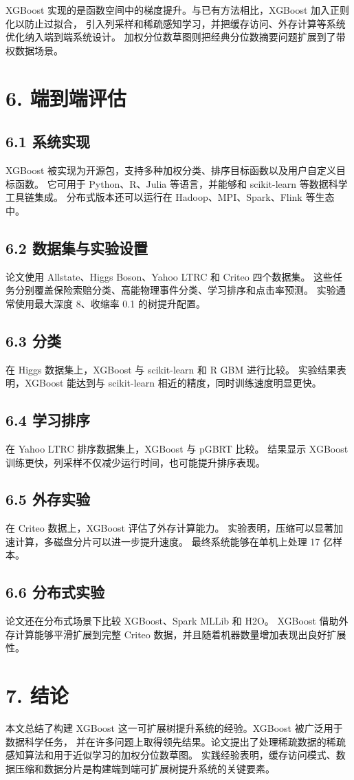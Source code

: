 XGBoost 实现的是函数空间中的梯度提升。与已有方法相比，XGBoost 加入正则化以防止过拟合，
引入列采样和稀疏感知学习，并把缓存访问、外存计算等系统优化纳入端到端系统设计。
加权分位数草图则把经典分位数摘要问题扩展到了带权数据场景。

\section{6. 端到端评估}

\subsection{6.1 系统实现}

XGBoost 被实现为开源包，支持多种加权分类、排序目标函数以及用户自定义目标函数。
它可用于 Python、R、Julia 等语言，并能够和 scikit-learn 等数据科学工具链集成。
分布式版本还可以运行在 Hadoop、MPI、Spark、Flink 等生态中。

\subsection{6.2 数据集与实验设置}

论文使用 Allstate、Higgs Boson、Yahoo LTRC 和 Criteo 四个数据集。
这些任务分别覆盖保险索赔分类、高能物理事件分类、学习排序和点击率预测。
实验通常使用最大深度 8、收缩率 0.1 的树提升配置。

\subsection{6.3 分类}

在 Higgs 数据集上，XGBoost 与 scikit-learn 和 R GBM 进行比较。
实验结果表明，XGBoost 能达到与 scikit-learn 相近的精度，同时训练速度明显更快。

\subsection{6.4 学习排序}

在 Yahoo LTRC 排序数据集上，XGBoost 与 pGBRT 比较。
结果显示 XGBoost 训练更快，列采样不仅减少运行时间，也可能提升排序表现。

\subsection{6.5 外存实验}

在 Criteo 数据上，XGBoost 评估了外存计算能力。
实验表明，压缩可以显著加速计算，多磁盘分片可以进一步提升速度。
最终系统能够在单机上处理 17 亿样本。

\subsection{6.6 分布式实验}

论文还在分布式场景下比较 XGBoost、Spark MLLib 和 H2O。
XGBoost 借助外存计算能够平滑扩展到完整 Criteo 数据，并且随着机器数量增加表现出良好扩展性。

\section{7. 结论}

本文总结了构建 XGBoost 这一可扩展树提升系统的经验。XGBoost 被广泛用于数据科学任务，
并在许多问题上取得领先结果。论文提出了处理稀疏数据的稀疏感知算法和用于近似学习的加权分位数草图。
实践经验表明，缓存访问模式、数据压缩和数据分片是构建端到端可扩展树提升系统的关键要素。

